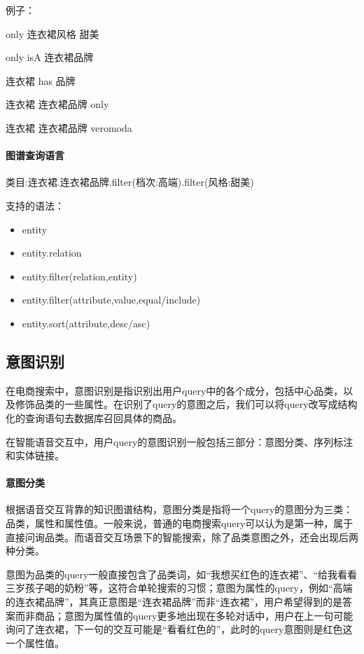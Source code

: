 例子：

only 连衣裙风格 甜美

only isA 连衣裙品牌

连衣裙 has 品牌

连衣裙 连衣裙品牌 only

连衣裙 连衣裙品牌 veromoda

\paragraph{图谱查询语言}

类目:连衣裙.连衣裙品牌.filter(档次:高端).filter(风格:甜美)

支持的语法：

\begin{itemize}
\item{entity}
\item{entity.relation}
\item{entity.filter(relation,entity)}
\item{entity.filter(attribute,value,equal/include)}
\item{entity.sort(attribute,desc/asc)}
\end{itemize}


\subsection{意图识别}

在电商搜索中，意图识别是指识别出用户query中的各个成分，包括中心品类，以及修饰品类的一些属性。在识别了query的意图之后，我们可以将query改写成结构化的查询语句去数据库召回具体的商品。

在智能语音交互中，用户query的意图识别一般包括三部分：意图分类、序列标注和实体链接。

\paragraph{意图分类}

根据语音交互背靠的知识图谱结构，意图分类是指将一个query的意图分为三类：品类，属性和属性值。一般来说，普通的电商搜索query可以认为是第一种，属于直接问询品类。而语音交互场景下的智能搜索，除了品类意图之外，还会出现后两种分类。

意图为品类的query一般直接包含了品类词，如“我想买红色的连衣裙”、“给我看看三岁孩子喝的奶粉”等，这符合单轮搜索的习惯；意图为属性的query，例如“高端的连衣裙品牌”，其真正意图是“连衣裙品牌”而非“连衣裙”，用户希望得到的是答案而非商品；意图为属性值的query更多地出现在多轮对话中，用户在上一句可能询问了连衣裙，下一句的交互可能是“看看红色的”，此时的query意图则是红色这一个属性值。

